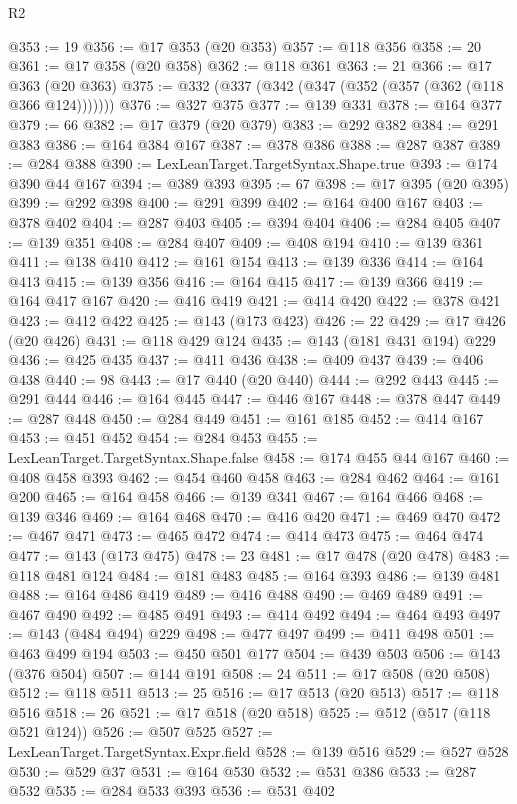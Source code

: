 \begin{lexlean}{R2}
\begin{coremodule}
@353 := 19
@356 := @17 @353 (@20 @353)
@357 := @118 @356
@358 := 20
@361 := @17 @358 (@20 @358)
@362 := @118 @361
@363 := 21
@366 := @17 @363 (@20 @363)
@375 := @332 (@337 (@342 (@347 (@352 (@357 (@362 (@118 @366 @124)))))))
@376 := @327 @375
@377 := @139 @331
@378 := @164 @377
@379 := 66
@382 := @17 @379 (@20 @379)
@383 := @292 @382
@384 := @291 @383
@386 := @164 @384 @167
@387 := @378 @386
@388 := @287 @387
@389 := @284 @388
@390 := LexLeanTarget.TargetSyntax.Shape.true
@393 := @174 @390 @44 @167
@394 := @389 @393
@395 := 67
@398 := @17 @395 (@20 @395)
@399 := @292 @398
@400 := @291 @399
@402 := @164 @400 @167
@403 := @378 @402
@404 := @287 @403
@405 := @394 @404
@406 := @284 @405
@407 := @139 @351
@408 := @284 @407
@409 := @408 @194
@410 := @139 @361
@411 := @138 @410
@412 := @161 @154
@413 := @139 @336
@414 := @164 @413
@415 := @139 @356
@416 := @164 @415
@417 := @139 @366
@419 := @164 @417 @167
@420 := @416 @419
@421 := @414 @420
@422 := @378 @421
@423 := @412 @422
@425 := @143 (@173 @423)
@426 := 22
@429 := @17 @426 (@20 @426)
@431 := @118 @429 @124
@435 := @143 (@181 @431 @194) @229
@436 := @425 @435
@437 := @411 @436
@438 := @409 @437
@439 := @406 @438
@440 := 98
@443 := @17 @440 (@20 @440)
@444 := @292 @443
@445 := @291 @444
@446 := @164 @445
@447 := @446 @167
@448 := @378 @447
@449 := @287 @448
@450 := @284 @449
@451 := @161 @185
@452 := @414 @167
@453 := @451 @452
@454 := @284 @453
@455 := LexLeanTarget.TargetSyntax.Shape.false
@458 := @174 @455 @44 @167
@460 := @408 @458 @393
@462 := @454 @460 @458
@463 := @284 @462
@464 := @161 @200
@465 := @164 @458
@466 := @139 @341
@467 := @164 @466
@468 := @139 @346
@469 := @164 @468
@470 := @416 @420
@471 := @469 @470
@472 := @467 @471
@473 := @465 @472
@474 := @414 @473
@475 := @464 @474
@477 := @143 (@173 @475)
@478 := 23
@481 := @17 @478 (@20 @478)
@483 := @118 @481 @124
@484 := @181 @483
@485 := @164 @393
@486 := @139 @481
@488 := @164 @486 @419
@489 := @416 @488
@490 := @469 @489
@491 := @467 @490
@492 := @485 @491
@493 := @414 @492
@494 := @464 @493
@497 := @143 (@484 @494) @229
@498 := @477 @497
@499 := @411 @498
@501 := @463 @499 @194
@503 := @450 @501 @177
@504 := @439 @503
@506 := @143 (@376 @504)
@507 := @144 @191
@508 := 24
@511 := @17 @508 (@20 @508)
@512 := @118 @511
@513 := 25
@516 := @17 @513 (@20 @513)
@517 := @118 @516
@518 := 26
@521 := @17 @518 (@20 @518)
@525 := @512 (@517 (@118 @521 @124))
@526 := @507 @525
@527 := LexLeanTarget.TargetSyntax.Expr.field
@528 := @139 @516
@529 := @527 @528
@530 := @529 @37
@531 := @164 @530
@532 := @531 @386
@533 := @287 @532
@535 := @284 @533 @393
@536 := @531 @402

\end{coremodule}
\end{lexlean}
